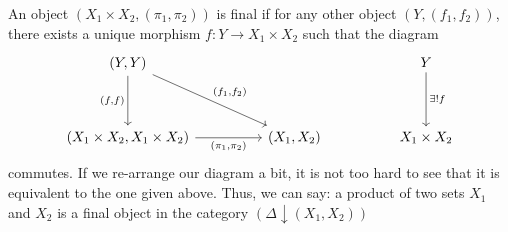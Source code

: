 \documentclass[notes.tex]{subfiles}
\begin{document}
\begin{example}
  An object $(X_{1}\times X_{2}, (\pi_{1}, \pi_{2}))$ is final if for any other object $(Y, (f_{1},f_{2}))$, there exists a unique morphism $f\colon Y \to X_{1} \times X_{2}$ such that the diagram
  \begin{equation*}
    \begin{tikzcd}[row sep=huge, column sep=huge]
      (Y, Y) \arrow[d, swap, "{(f, f)}"] \arrow[rd, "{(f_{1}, f_{2})}"] & & Y \arrow[d, "\exists!f"]\\
      (X_{1}\times X_{2}, X_{1}\times X_{2}) \arrow[r, swap, "{(\pi_{1}, \pi_{2})}"] &  (X_{1}, X_{2})& X_{1}\times X_{2}
    \end{tikzcd}
  \end{equation*}
  commutes. If we re-arrange our diagram a bit, it is not too hard to see that it is equivalent to the one given above. Thus, we can say: a product of two sets $X_{1}$ and $X_{2}$ is a final object in the category $(\Delta \downarrow (X_{1}, X_{2}))$
\end{example}
\end{document}
